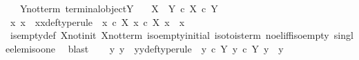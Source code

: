\begin{isabellebody}
\ \ \ Y{\isacharunderscore}{\kern0pt}not{\isacharunderscore}{\kern0pt}term{\isacharcolon}{\kern0pt}\ {\isachardoublequoteopen}{\isasymnot}{\isacharparenleft}{\kern0pt}terminal{\isacharunderscore}{\kern0pt}object{\isacharparenleft}{\kern0pt}Y{\isacharparenright}{\kern0pt}{\isacharparenright}{\kern0pt}{\isachardoublequoteclose}\isanewline
\ \ \ {\isachardoublequoteopen}X\ {\isasymCoprod}\ Y\ {\isasymle}\isactrlsub c\ X\ {\isasymtimes}\isactrlsub c\ Y{\isachardoublequoteclose}\isanewline
%
\isadelimproof
%
\endisadelimproof
%
\isatagproof
{}\isamarkupfalse%
\ {\isacharminus}{\kern0pt}\ \isanewline
\ \ \isamarkupfalse%
\ x{}\ x{}\ \ x{}x{}{\isacharunderscore}{\kern0pt}def{\isacharbrackleft}{\kern0pt}type{\isacharunderscore}{\kern0pt}rule{\isacharbrackright}{\kern0pt}{\isacharcolon}{\kern0pt}\ \ {\isachardoublequoteopen}{\isacharparenleft}{\kern0pt}x{}\ {\isasymin}\isactrlsub c\ X{\isacharparenright}{\kern0pt}{\isachardoublequoteclose}\ {\isachardoublequoteopen}{\isacharparenleft}{\kern0pt}x{}\ {\isasymin}\isactrlsub c\ X{\isacharparenright}{\kern0pt}{\isachardoublequoteclose}\ {\isachardoublequoteopen}{\isacharparenleft}{\kern0pt}x{}\ {\isasymnoteq}\ x{}{\isacharparenright}{\kern0pt}{\isachardoublequoteclose}\isanewline
\ \ \ \ \isamarkupfalse%
\ is{\isacharunderscore}{\kern0pt}empty{\isacharunderscore}{\kern0pt}def\ X{\isacharunderscore}{\kern0pt}not{\isacharunderscore}{\kern0pt}init\ X{\isacharunderscore}{\kern0pt}not{\isacharunderscore}{\kern0pt}term\ iso{\isacharunderscore}{\kern0pt}empty{\isacharunderscore}{\kern0pt}initial\ iso{\isacharunderscore}{\kern0pt}to{}{\isacharunderscore}{\kern0pt}is{\isacharunderscore}{\kern0pt}term\ no{\isacharunderscore}{\kern0pt}el{\isacharunderscore}{\kern0pt}iff{\isacharunderscore}{\kern0pt}iso{\isacharunderscore}{\kern0pt}empty\ single{\isacharunderscore}{\kern0pt}elem{\isacharunderscore}{\kern0pt}iso{\isacharunderscore}{\kern0pt}one\ \isamarkupfalse%
\ blast\isanewline
\ \ \isamarkupfalse%
\ y{}\ y{}\ \ y{}y{}{\isacharunderscore}{\kern0pt}def{\isacharbrackleft}{\kern0pt}type{\isacharunderscore}{\kern0pt}rule{\isacharbrackright}{\kern0pt}{\isacharcolon}{\kern0pt}\ \ {\isachardoublequoteopen}{\isacharparenleft}{\kern0pt}y{}\ {\isasymin}\isactrlsub c\ Y{\isacharparenright}{\kern0pt}{\isachardoublequoteclose}\ {\isachardoublequoteopen}{\isacharparenleft}{\kern0pt}y{}\ {\isasymin}\isactrlsub c\ Y{\isacharparenright}{\kern0pt}{\isachardoublequoteclose}\ {\isachardoublequoteopen}{\isacharparenleft}{\kern0pt}y{}\ {\isasymnoteq}\ y{}{\isacharparenright}{\kern0pt}{\isachardoublequoteclose}\isanewline

\end{isabellebody}
